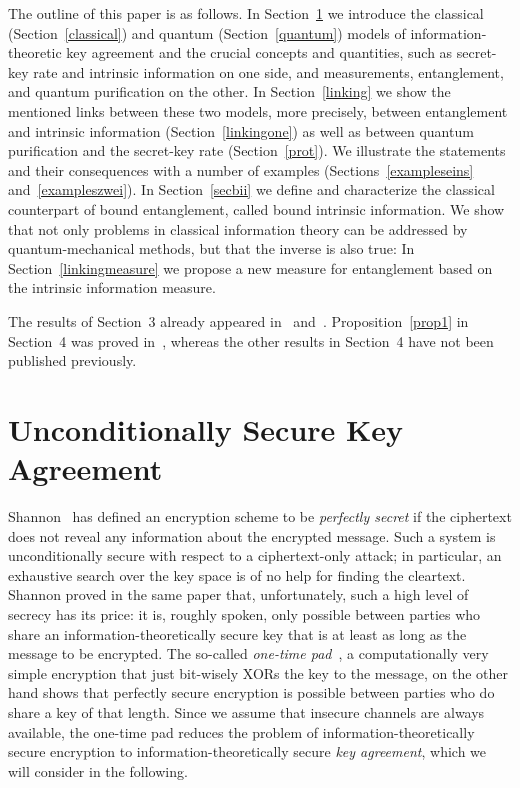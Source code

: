 \documentclass{article}
\begin{document}
The outline of this paper is as follows. In Section~\ref{models} we introduce 
the classical (Section~\ref{classical}) and quantum (Section~\ref{quantum})
models 
of information-theoretic key agreement
and the crucial  concepts and quantities, such as  secret-key 
rate and intrinsic information on one side, and measurements,
entanglement, and quantum
purification on the other.
In Section~\ref{linking} we show the mentioned links between these two 
models, more precisely, between entanglement and intrinsic information
(Section~\ref{linkingone}) as well as between quantum purification
and the secret-key rate (Section~\ref{prot}).
We illustrate the statements and their consequences with a number of examples
(Sections~\ref{exampleseins} and~\ref{exampleszwei}). 
In Section~\ref{secbii} we define and characterize the classical 
counterpart of bound entanglement, called bound intrinsic information. 
We show that 
not only   
problems  in classical information theory can be 
addressed by quantum-mechanical methods, but that the inverse is also  true:
In Section~\ref{linkingmeasure}
we propose a new measure for entanglement  
based on the intrinsic information measure.



The results of Section~3 already appeared in~\cite{giswol99} 
and~\cite{giswol00}. Proposition~\ref{prop1} in Section~4 was 
proved in~\cite{grw00}, whereas the other  results in Section~4 
have not been  published previously. 









\section{Unconditionally Secure Key Agreement}
\label{models}


Shannon~\cite{shannon} has defined an encryption scheme to be 
{\em perfectly secret\/}
if the ciphertext does not reveal 
any information about the encrypted message. Such a system 
is  unconditionally secure with respect to a ciphertext-only 
attack; in particular, an exhaustive search over the key space is 
of no help for finding the cleartext. Shannon 
proved in the same paper that, unfortunately, such a high level of secrecy has
its price: it is, roughly spoken, only possible between parties
who share an information-theoretically secure key that is at least 
as long as the message to be encrypted. The so-called {\em one-time
pad\/}~\cite{vernam26}, a computationally very simple encryption 
that just bit-wisely XORs the key to the message, on the other 
hand shows that perfectly secure encryption is possible between parties
who do share a key of that length. Since we assume that insecure 
channels are always available, the one-time pad  reduces the problem
of information-theoretically secure encryption to 
information-theoretically secure {\em key agreement}, which we will 
consider in the following.
\end{document}

